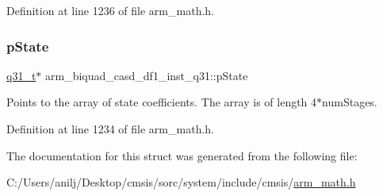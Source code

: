 Definition at line 1236 of file arm\+\_\+math.\+h.

\mbox{\label{structarm__biquad__casd__df1__inst__q31_a5dcf4727f58eb4e8e8b392508d8657bb}} 
\subsubsection{\texorpdfstring{p\+State}{pState}}
{\footnotesize\ttfamily \hyperlink{arm__math_8h_adc89a3547f5324b7b3b95adec3806bc0}{q31\+\_\+t}$\ast$ arm\+\_\+biquad\+\_\+casd\+\_\+df1\+\_\+inst\+\_\+q31\+::p\+State}

Points to the array of state coefficients. The array is of length 4$\ast$num\+Stages. 

Definition at line 1234 of file arm\+\_\+math.\+h.



The documentation for this struct was generated from the following file\+:\begin{DoxyCompactItemize}
\item 
C\+:/\+Users/anilj/\+Desktop/cmsis/sorc/system/include/cmsis/\hyperlink{arm__math_8h}{arm\+\_\+math.\+h}\end{DoxyCompactItemize}
